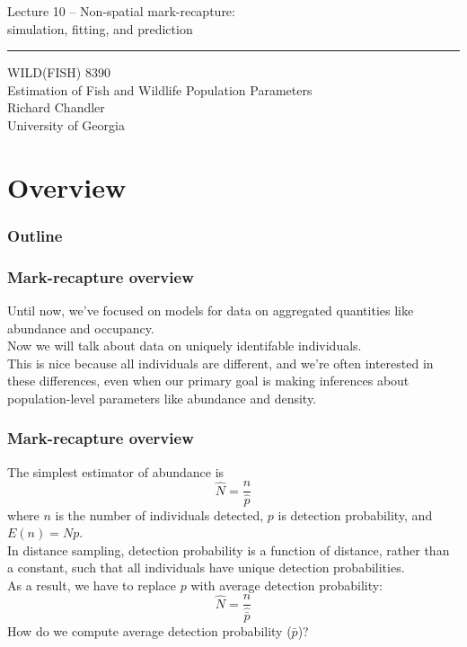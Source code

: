 \documentclass[color=usenames,dvipsnames]{beamer}\usepackage[]{graphicx}\usepackage[]{color}
\begin{document}
\begin{frame}[plain]
  \LARGE
  \centering
  {
    \LARGE Lecture 10 -- Non-spatial mark-recapture: \\
    \Large simulation, fitting, and prediction \\
  }
  {\color{default} \rule{\textwidth}{0.1pt} }
  \vfill
  \large
  WILD(FISH) 8390 \\
  Estimation of Fish and Wildlife Population Parameters \\
  \vfill
  \large
  Richard Chandler \\
  University of Georgia \\
\end{frame}






\section{Overview}



\begin{frame}[plain]
  \frametitle{Outline}
  \Large
\end{frame}



\begin{frame}
  \frametitle{Mark-recapture overview}
  Until now, we've focused on models for data on aggregated quantities
  like abundance and occupancy. \\ 
  \pause
  \vfill
  Now we will talk about data on uniquely identifable individuals. \\
  \pause
  \vfill
  This is nice because all individuals are different, and we're often
  interested in these differences, even when our primary goal is
  making inferences about population-level parameters like abundance
  and density. \\
\end{frame}



\begin{frame}
  \frametitle{Mark-recapture overview}
  The simplest estimator of abundance is 
  \[
    \hat{N} = \frac{n}{\hat{p}}
  \]
  where $n$ is the number of individuals detected, $p$ is detection
  probability, and $E(n)=Np$. \\
  \pause
  \vfill
  In distance sampling, detection probability is a \alert{function} of
  distance, rather than a constant, such that all individuals have
  unique detection probabilities. \\
  \pause
  \vfill
  As a result, we have to replace
  $p$ with \alert{average} detection probability:
  \[
    \hat{N} = \frac{n}{\hat{\bar{p}}}
  \]
  \pause
  \vfill
  How do we compute average detection probability ($\bar{p}$)?
\end{frame}
\end{document}
